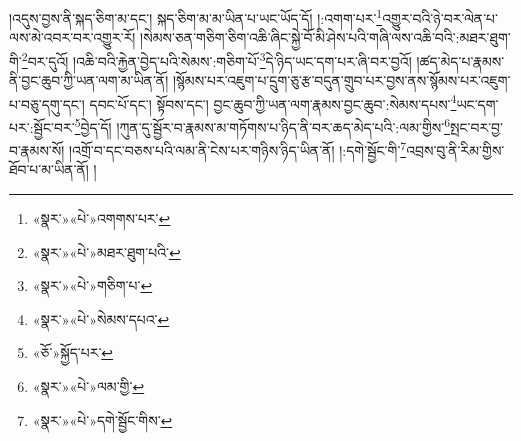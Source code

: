 །འདུས་བྱས་ནི་སྐད་ཅིག་མ་དང་། སྐད་ཅིག་མ་མ་ཡིན་པ་ཡང་ཡོད་དོ། །:འགག་པར་\footnote{«སྣར་»«པེ་»འགགས་པར་}འགྱུར་བའི་ཉེ་བར་ལེན་པ་ལས་མེ་འབར་བར་འགྱུར་རོ། །སེམས་ཅན་གཅིག་ཅིག་འཆི་ཞིང་སྐྱེ་བོ་མི་ཤེས་པའི་གཞི་ལས་འཆི་བའི་:མཐར་ཐུག་གི་\footnote{«སྣར་»«པེ་»མཐར་ཐུག་པའི་}བར་དུའོ། །འཆི་བའི་རྐྱེན་བྱེད་པའི་སེམས་:གཅིག་པོ་\footnote{«སྣར་»«པེ་»གཅིག་པ་}དེ་ཉིད་ཡང་དག་པར་ཞི་བར་བྱའོ། །ཚད་མེད་པ་རྣམས་ནི་བྱང་ཆུབ་ཀྱི་ཡན་ལག་མ་ཡིན་ནོ། །སྙོམས་པར་འཇུག་པ་དྲུག་ཅུ་རྩ་བདུན་གྲུབ་པར་བྱས་ནས་སྙོམས་པར་འཇུག་པ་བཅུ་དགུ་དང་། དབང་པོ་དང་། སྟོབས་དང་། བྱང་ཆུབ་ཀྱི་ཡན་ལག་རྣམས་བྱང་ཆུབ་:སེམས་དཔས་\footnote{«སྣར་»«པེ་»སེམས་དཔའ་}ཡང་དག་པར་:སྦྱོང་བར་\footnote{«ཅོ་»སྐྱོད་པར་}བྱེད་དོ། །ཀུན་དུ་སྦྱོར་བ་རྣམས་མ་གཏོགས་པ་ཉིད་ནི་བར་ཆད་མེད་པའི་:ལམ་གྱིས་\footnote{«སྣར་»«པེ་»ལམ་གྱི་}སྤང་བར་བྱ་བ་རྣམས་སོ། །འགྲོ་བ་དང་བཅས་པའི་ལམ་ནི་ངེས་པར་གཉིས་ཉིད་ཡིན་ནོ། །:དགེ་སྦྱོང་གི་\footnote{«སྣར་»«པེ་»དགེ་སྦྱོང་གིས་}འབྲས་བུ་ནི་རིམ་གྱིས་ཐོབ་པ་མ་ཡིན་ནོ། །
